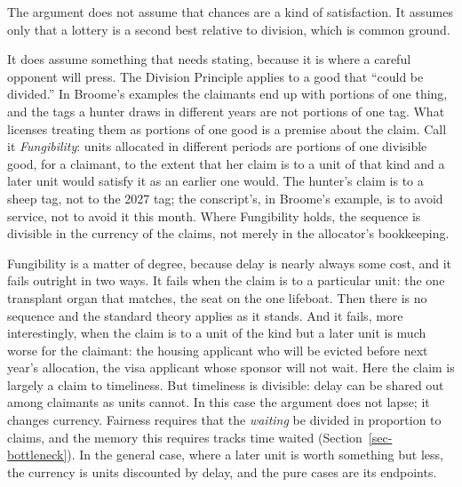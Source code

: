 \documentclass[
  11pt,
  letterpaper,
  DIV=11,
  numbers=noendperiod,
  twoside]{scrartcl}
\begin{document}
The argument does not assume that chances are a kind of satisfaction. It
assumes only that a lottery is a second best relative to division, which
is common ground.

It does assume something that needs stating, because it is where a
careful opponent will press. The Division Principle applies to a good
that ``could be divided.'' In Broome's examples the claimants end up
with portions of one thing, and the tags a hunter draws in different
years are not portions of one tag. What licenses treating them as
portions of one good is a premise about the claim. Call it
\emph{Fungibility}: units allocated in different periods are portions of
one divisible good, for a claimant, to the extent that her claim is to a
unit of that kind and a later unit would satisfy it as an earlier one
would. The hunter's claim is to a sheep tag, not to the 2027 tag; the
conscript's, in Broome's example, is to avoid service, not to avoid it
this month. Where Fungibility holds, the sequence is divisible in the
currency of the claims, not merely in the allocator's bookkeeping.

Fungibility is a matter of degree, because delay is nearly always some
cost, and it fails outright in two ways. It fails when the claim is to a
particular unit: the one transplant organ that matches, the seat on the
one lifeboat. Then there is no sequence and the standard theory applies
as it stands. And it fails, more interestingly, when the claim is to a
unit of the kind but a later unit is much worse for the claimant: the
housing applicant who will be evicted before next year's allocation, the
visa applicant whose sponsor will not wait. Here the claim is largely a
claim to timeliness. But timeliness is divisible: delay can be shared
out among claimants as units cannot. In this case the argument does not
lapse; it changes currency. Fairness requires that the \emph{waiting} be
divided in proportion to claims, and the memory this requires tracks
time waited (Section~\ref{sec-bottleneck}). In the general case, where a
later unit is worth something but less, the currency is units discounted
by delay, and the pure cases are its endpoints.
\end{document}

